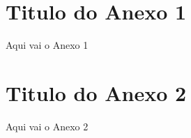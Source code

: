 \begin{anexosenv}
	\chapter{Titulo do Anexo 1}
	
	Aqui vai o Anexo 1
	
	\chapter{Titulo do Anexo 2}
	
	Aqui vai o Anexo 2
\end{anexosenv}